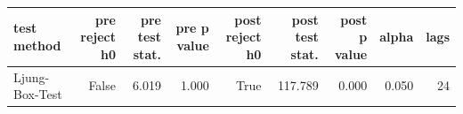 \begin{tabular}{lrrrrrrrr}
\toprule
test method & pre reject h0 & pre test stat. & pre p value & post reject h0 & post test stat. & post p value & alpha & lags \\
\midrule
Ljung-Box-Test & False & 6.019 & 1.000 & True & 117.789 & 0.000 & 0.050 & 24 \\
\bottomrule
\end{tabular}
